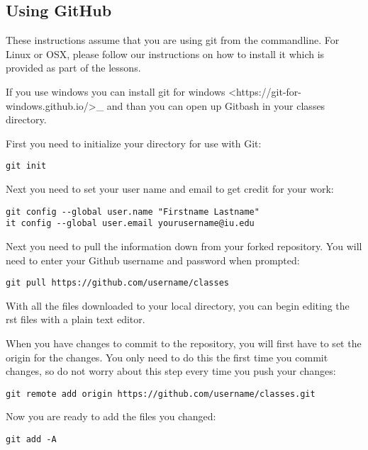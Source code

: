\subsection{Using GitHub}\label{using-github}

These instructions assume that you are using git from the commandline.
For Linux or OSX, please follow our instructions on how to install it
which is provided as part of the lessons.

If you use windows you can install
git for windows \textless{}https://git-for-windows.github.io/\textgreater{}\_
and than you can open up Gitbash in your classes directory.

First you need to initialize your directory for use with Git:

\begin{verbatim}
git init
\end{verbatim}

Next you need to set your user name and email to get credit for your
work:

\begin{verbatim}
git config --global user.name "Firstname Lastname"
it config --global user.email yourusername@iu.edu
\end{verbatim}

Next you need to pull the information down from your forked repository.
You will need to enter your Github username and password when prompted:

\begin{verbatim}
git pull https://github.com/username/classes
\end{verbatim}

With all the files downloaded to your local directory, you can begin
editing the rst files with a plain text editor.

When you have changes to commit to the repository, you will first have
to set the origin for the changes. You only need to do this the first
time you commit changes, so do not worry about this step every time you
push your changes:

\begin{verbatim}
git remote add origin https://github.com/username/classes.git
\end{verbatim}

Now you are ready to add the files you changed:

\begin{verbatim}
git add -A
\end{verbatim}

